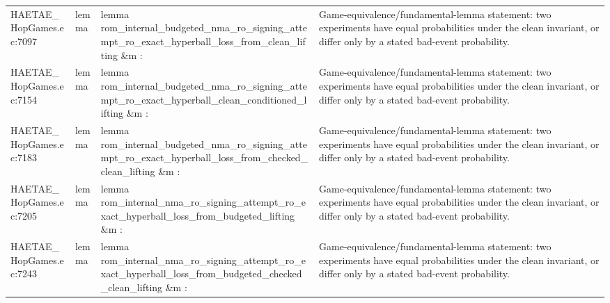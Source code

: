 \documentclass[10pt]{article}
\begin{document}
\begin{longtable}{L{0.11\textwidth}L{0.055\textwidth}L{0.385\textwidth}L{0.41\textwidth}}
HAETAE\_\allowbreak{}HopGames.\allowbreak{}ec:\allowbreak{}7097 & lemma & {\ttfamily\scriptsize lemma rom\_\allowbreak{}internal\_\allowbreak{}budgeted\_\allowbreak{}nma\_\allowbreak{}ro\_\allowbreak{}signing\_\allowbreak{}attempt\_\allowbreak{}ro\_\allowbreak{}exact\_\allowbreak{}hyperball\_\allowbreak{}loss\_\allowbreak{}from\_\allowbreak{}clean\_\allowbreak{}lifting \&m :} & Game-equivalence/fundamental-lemma statement: two experiments have equal probabilities under the clean invariant, or differ only by a stated bad-event probability. \\
HAETAE\_\allowbreak{}HopGames.\allowbreak{}ec:\allowbreak{}7154 & lemma & {\ttfamily\scriptsize lemma rom\_\allowbreak{}internal\_\allowbreak{}budgeted\_\allowbreak{}nma\_\allowbreak{}ro\_\allowbreak{}signing\_\allowbreak{}attempt\_\allowbreak{}ro\_\allowbreak{}exact\_\allowbreak{}hyperball\_\allowbreak{}clean\_\allowbreak{}conditioned\_\allowbreak{}lifting \&m :} & Game-equivalence/fundamental-lemma statement: two experiments have equal probabilities under the clean invariant, or differ only by a stated bad-event probability. \\
HAETAE\_\allowbreak{}HopGames.\allowbreak{}ec:\allowbreak{}7183 & lemma & {\ttfamily\scriptsize lemma rom\_\allowbreak{}internal\_\allowbreak{}budgeted\_\allowbreak{}nma\_\allowbreak{}ro\_\allowbreak{}signing\_\allowbreak{}attempt\_\allowbreak{}ro\_\allowbreak{}exact\_\allowbreak{}hyperball\_\allowbreak{}loss\_\allowbreak{}from\_\allowbreak{}checked\_\allowbreak{}clean\_\allowbreak{}lifting \&m :} & Game-equivalence/fundamental-lemma statement: two experiments have equal probabilities under the clean invariant, or differ only by a stated bad-event probability. \\
HAETAE\_\allowbreak{}HopGames.\allowbreak{}ec:\allowbreak{}7205 & lemma & {\ttfamily\scriptsize lemma rom\_\allowbreak{}internal\_\allowbreak{}nma\_\allowbreak{}ro\_\allowbreak{}signing\_\allowbreak{}attempt\_\allowbreak{}ro\_\allowbreak{}exact\_\allowbreak{}hyperball\_\allowbreak{}loss\_\allowbreak{}from\_\allowbreak{}budgeted\_\allowbreak{}lifting \&m :} & Game-equivalence/fundamental-lemma statement: two experiments have equal probabilities under the clean invariant, or differ only by a stated bad-event probability. \\
HAETAE\_\allowbreak{}HopGames.\allowbreak{}ec:\allowbreak{}7243 & lemma & {\ttfamily\scriptsize lemma rom\_\allowbreak{}internal\_\allowbreak{}nma\_\allowbreak{}ro\_\allowbreak{}signing\_\allowbreak{}attempt\_\allowbreak{}ro\_\allowbreak{}exact\_\allowbreak{}hyperball\_\allowbreak{}loss\_\allowbreak{}from\_\allowbreak{}budgeted\_\allowbreak{}checked\_\allowbreak{}clean\_\allowbreak{}lifting \&m :} & Game-equivalence/fundamental-lemma statement: two experiments have equal probabilities under the clean invariant, or differ only by a stated bad-event probability. \\

\end{longtable}
\end{document}
